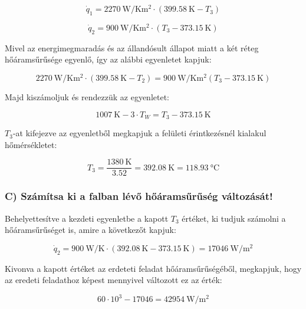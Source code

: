\begin{equation}     
     \dot{q}_1 = \SI{2270}{\watt\per\kelvin\meter\squared} \cdot (\SI{399.58}{\kelvin} - T_3)
\end{equation}


 \begin{equation}   
    \dot{q}_2 = \SI{900}{\watt\per\kelvin\meter\squared} \cdot (T_3 - \SI{373.15}{\kelvin})
\end{equation}

    Mivel az energimegmaradás és az állandósult állapot miatt a két réteg hőáramsűrűsége egyenlő, így az alábbi egyenletet kapjuk:
    
\begin{equation}    
     \SI{2270}{\watt\per\kelvin\meter\squared} \cdot (\SI{399.58}{\kelvin}-T_2) =  \SI{900}{\watt\per\kelvin\meter\squared}(T_3-\SI{373.15}{\kelvin})
\end{equation}

Majd kiszámoljuk és rendezzük az egyenletet:

\begin{equation}
    \SI{1007}{\kelvin}-3 \cdot T_W = T_3-\SI{373.15}{\kelvin}
\end{equation}
        
$T_3$-at kifejezve az egyenletből megkapjuk a felületi érintkezésnél kialakul hőmérsékletet:

\begin{equation}
    T_3 = \frac{\SI{1380}{\kelvin}}{3.52} = \SI{392.08}{\kelvin} = \SI{118,93}{\celsius}
\end{equation}
    
\subsubsection*{C) Számítsa ki a falban lévő hőáramsűrűség változását!}
    
Behelyettesítve a kezdeti egyenletbe a kapott $T_3$ értéket, ki tudjuk számolni a hőáramsűrűséget is, amire a következőt kapjuk:
    
\begin{equation}
     \dot{q}_2 = \SI{900}{\watt\per\K} \cdot (\SI{392.08}{\kelvin} - \SI{373.15}{\kelvin}) = \SI{17046}{\watt\per\meter\squared}
\end{equation}

Kivonva a kapott értéket az erdeteti feladat hőáramsűrűségéből, megkapjuk, hogy az eredeti feladathoz képest mennyivel változott ez az érték:

\begin{equation}
            60 \cdot 10^3 - 17046 =  \SI{42954}{\watt\per\meter\squared}
\end{equation}

